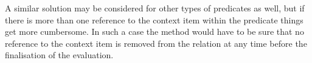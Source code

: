 A similar solution may be considered for other types of predicates as well, but if there is more than one
reference to the context item within the predicate things get more cumbersome. In such a case the method would
have to be sure that no reference to the context item is removed from the relation at any time before the
finalisation of the evaluation.